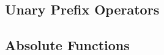 \begin{description} %

\subsection{Unary Prefix Operators}

\begin{description}  %

\section{Absolute Functions}

\begin{description} %


\end{description}
\end{description}
\end{description}
